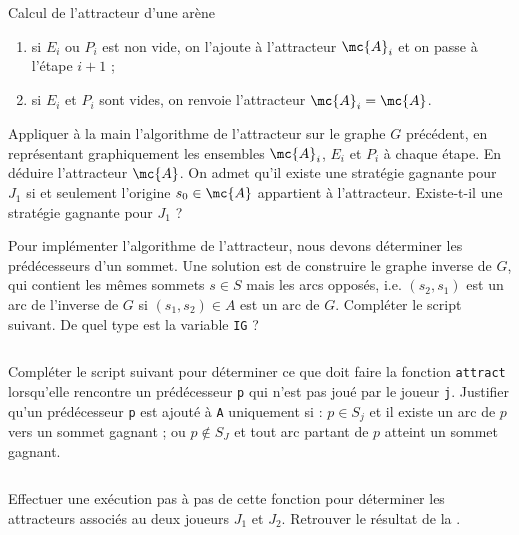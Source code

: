 \begin{exo}[PC][1][devoir]{Calcul de l’attracteur d’une arène}
\begin{liste}
\begin{enumerate}
    \item si $E_i$ ou $P_i$ est non vide, on l’ajoute à l'attracteur $\mc{A}_i$ et on passe à l'étape $i+1$ ;
    \item si $E_i$ et $P_i$ sont vides, on renvoie l'attracteur $\mc{A}_i = \mc{A}$.
  \end{enumerate}
\end{liste}
\begin{quest}
\item\label{quest:attract} Appliquer à la main l'algorithme de l'attracteur sur le graphe $G$ précédent, en représentant graphiquement les ensembles $\mc{A}_i$, $E_i$ et $P_i$ à chaque étape. En déduire l'attracteur $\mc{A}$. On admet qu'il existe une stratégie gagnante pour $J_1$ si et seulement l'origine $s_0 \in \mc{A}$ appartient à l'attracteur. Existe-t-il une stratégie gagnante pour $J_1$ ?

\item Pour implémenter l'algorithme de l'attracteur, nous devons déterminer les prédécesseurs d'un sommet. Une solution est de construire le graphe inverse de $G$, qui contient les mêmes sommets $s \in S$ mais les arcs opposés, i.e. $(s_2,s_1)$ est un arc de l'inverse de $G$ si $(s_1,s_2)\in A$ est un arc de $G$. Compléter le script suivant.  De quel type est la variable \texttt{IG} ?
\inputminted[linenos=true]{python}{\pathtoexos/Info/Scripts/attract3.py}
\item  Compléter le script suivant pour déterminer ce que doit faire la fonction \texttt{attract} lorsqu'elle rencontre un prédécesseur \texttt{p} qui n'est pas joué par le joueur \texttt{j}. Justifier qu'un prédécesseur \texttt{p} est ajouté à \texttt{A} uniquement si : $p\in S_j$ et il existe un arc de $p$ vers un sommet gagnant ; ou $p \notin S_J$ et tout arc partant de $p$ atteint un sommet gagnant.


\inputminted[linenos=true]{python}{\pathtoexos/Info/Scripts/attract4.py}
\item Effectuer une exécution pas à pas de cette fonction pour déterminer les attracteurs associés au deux joueurs $J_1$ et $J_2$.  Retrouver le résultat de la .
\end{quest}
\end{exo}

